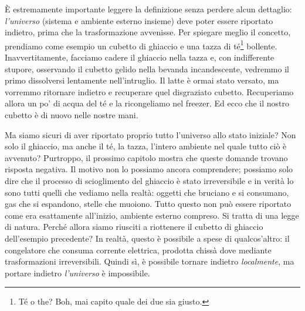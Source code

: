 È estremamente importante leggere la definizione senza perdere alcun
dettaglio: \emph{l'universo} (sistema e ambiente esterno insieme) deve poter
essere riportato indietro, prima che la trasformazione avvenisse.
Per spiegare meglio il concetto, prendiamo come esempio un cubetto di ghiaccio e una tazza di
té\footnote{Té o the? Boh, mai capito quale dei due sia giusto.} bollente.
Inavvertitamente, facciamo cadere il ghiaccio nella tazza e,
con indifferente stupore, osservando il cubetto gelido nella bevanda
incandescente, vedremmo il primo dissolversi lentamente nell'intruglio.
Il latte è ormai stato versato, ma vorremmo ritornare indietro e
recuperare quel disgraziato cubetto. Recuperiamo allora un po' di acqua
del té e la ricongeliamo nel freezer. Ed ecco che il nostro cubetto
è di nuovo nelle nostre mani.

Ma siamo sicuri di aver riportato proprio tutto l'universo
allo stato iniziale? Non solo il ghiaccio, ma anche il té, la tazza,
l'intero ambiente nel quale tutto ciò è avvenuto? Purtroppo, il prossimo
capitolo mostra che queste domande trovano risposta negativa. Il motivo
non lo possiamo ancora comprendere; possiamo solo dire che il processo
di scioglimento del ghiaccio è stato irreversibile e in verità lo sono
tutti quelli che vediamo nella realtà: oggetti che bruciano e si consumano,
gas che si espandono, stelle che muoiono. Tutto questo non può essere
riportato come era esattamente all'inizio, ambiente esterno compreso.
Si tratta di una legge di natura. Perché allora siamo riusciti a riottenere
il cubetto di ghiaccio dell'esempio precedente? In realtà, questo è possibile
a spese di qualcos'altro: il congelatore che consuma corrente elettrica,
prodotta chissà dove mediante trasformazioni irreversibili.
Quindi sì, è possibile tornare indietro \emph{localmente}, ma portare
indietro \emph{l'universo} è impossibile.